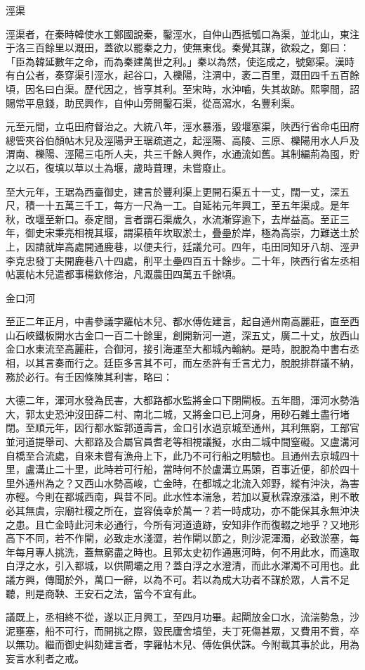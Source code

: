 \begin{pinyinscope}
 涇渠



 涇渠者，在秦時韓使水工鄭國說秦，鑿涇水，自仲山西抵瓠口為渠，並北山，東注于洛三百餘里以溉田，蓋欲以罷秦之力，使無東伐。秦覺其謀，欲殺之，鄭曰：「臣為韓延數年之命，而為秦建萬世之利。」秦以為然，使迄成之，號鄭渠。漢時有白公者，奏穿渠引涇水，起谷口，入櫟陽，注渭中，袤二百里，溉田四千五百餘頃，因名曰白渠。歷代因之，皆享其利。至宋時，水沖嚙，失其故跡。熙寧間，詔賜常平息錢，助民興作，自仲山旁開鑿石渠，從高瀉水，名豐利渠。



 元至元間，立屯田府督治之。大統八年，涇水暴漲，毀堰塞渠，陜西行省命屯田府總管夾谷伯顏帖木兒及涇陽尹王琚疏道之，起涇陽、高陵、三原、櫟陽用水人戶及渭南、櫟陽、涇陽三屯所人夫，共三千餘人興作，水通流如舊。其制編荊為囤，貯之以石，復填以草以土為堰，歲時葺理，未嘗廢止。



 至大元年，王琚為西臺御史，建言於豐利渠上更開石渠五十一丈，闊一丈，深五尺，積一十五萬三千工，每方一尺為一工。自延祐元年興工，至五年渠成。是年秋，改堰至新口。泰定間，言者謂石渠歲久，水流漸穿逾下，去岸益高。至正三年，御史宋秉亮相視其堰，謂渠積年坎取淤土，疊壘於岸，極為高崇，力難送土於上，因請就岸高處開通鹿巷，以便夫行，廷議允可。四年，屯田同知牙八胡、涇尹李克忠發丁夫開鹿巷八十四處，削平土壘四百五十餘步。二十年，陜西行省左丞相帖裏帖木兒遣都事楊欽修治，凡溉農田四萬五千餘頃。



 金口河



 至正二年正月，中書參議孛羅帖木兒、都水傅佐建言，起自通州南高麗莊，直至西山石峽鐵板開水古金口一百二十餘里，創開新河一道，深五丈，廣二十丈，放西山金口水東流至高麗莊，合御河，接引海運至大都城內輸納。是時，脫脫為中書右丞相，以其言奏而行之。廷臣多言其不可，而左丞許有壬言尤力，脫脫排群議不納，務於必行。有壬因條陳其利害，略曰：



 大德二年，渾河水發為民害，大都路都水監將金口下閉閘板。五年間，渾河水勢浩大，郭太史恐沖沒田薛二村、南北二城，又將金口已上河身，用砂石雜土盡行堵閉。至順元年，因行都水監郭道壽言，金口引水過京城至通州，其利無窮，工部官並河道提舉司、大都路及合屬官員耆老等相視議擬，水由二城中間窒礙。又盧溝河自橋至合流處，自來未嘗有漁舟上下，此乃不可行船之明驗也。且通州去京城四十里，盧溝止二十里，此時若可行船，當時何不於盧溝立馬頭，百事近便，卻於四十里外通州為之？又西山水勢高峻，亡金時，在都城之北流入郊野，縱有沖決，為害亦輕。今則在都城西南，與昔不同。此水性本湍急，若加以夏秋霖潦漲溢，則不敢必其無虞，宗廟社稷之所在，豈容僥幸於萬一？若一時成功，亦不能保其永無沖決之患。且亡金時此河未必通行，今所有河道遺跡，安知非作而復輟之地乎？又地形高下不同，若不作閘，必致走水淺澀，若作閘以節之，則沙泥渾濁，必致淤塞，每年每月專人挑洗，蓋無窮盡之時也。且郭太史初作通惠河時，何不用此水，而遠取白浮之水，引入都城，以供閘壩之用？蓋白浮之水澄清，而此水渾濁不可用也。此議方興，傳聞於外，萬口一辭，以為不可。若以為成大功者不謀於眾，人言不足聽，則是商鞅、王安石之法，當今不宜有此。



 議既上，丞相終不從，遂以正月興工，至四月功畢。起閘放金口水，流湍勢急，沙泥壅塞，船不可行，而開挑之際，毀民廬舍墳塋，夫丁死傷甚眾，又費用不貲，卒以無功。繼而御史糾劾建言者，孛羅帖木兒、傅佐俱伏誅。今附載其事於此，用為妄言水利者之戒。



\end{pinyinscope}